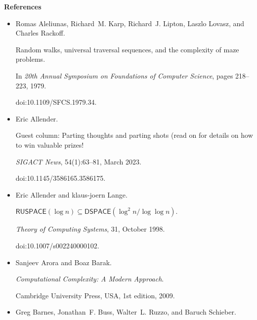 \par\medskip\noindent\textbf{References}\par



\begin{itemize}


\item[] 
[1]

Romas Aleliunas, Richard M. Karp, Richard J. Lipton, Laszlo Lovasz, and Charles
Rackoff.


Random walks, universal traversal sequences, and the complexity of
maze problems.


In \emph{20th Annual Symposium on Foundations of Computer Science},
pages 218–223, 1979.


doi:10.1109/SFCS.1979.34.





\item[] 
[2]

Eric Allender.


Guest column: Parting thoughts and parting shots (read on for details
on how to win valuable prizes!


\emph{SIGACT News}, 54(1):63–81, March 2023.


doi:10.1145/3586165.3586175.





\item[] 
[3]

Eric Allender and klaus-joern Lange.


$\mathsf{RUSPACE}(\log n)\subseteq\mathsf{DSPACE}(\log^{2}n/\log\log n)$.


\emph{Theory of Computing Systems}, 31, October 1998.


doi:10.1007/s002240000102.





\item[] 
[4]

Sanjeev Arora and Boaz Barak.


\emph{Computational Complexity: A Modern Approach}.


Cambridge University Press, USA, 1st edition, 2009.





\item[] 
[5]

Greg Barnes, Jonathan F. Buss, Walter L. Ruzzo, and Baruch Schieber.



\end{itemize}
